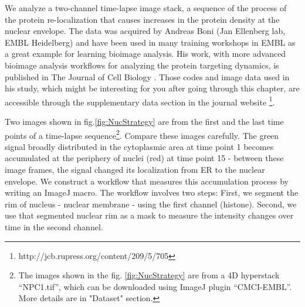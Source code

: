  We analyze a two-channel time-lapse image stack, a sequence of the process of the protein re-localization that causes increases in the protein density at the nuclear envelope. The data was acquired by Andreas Boni (Jan Ellenberg lab, EMBL Heidelberg) and have been used in many training workshops in EMBL as a great example for learning bioimage analysis. His work, with more advanced bioimage analysis workflows for analyzing the protein targeting dynamics, is published in The Journal of Cell Biology \citep{Boni2015}. Those codes and image data used in his study, which might be interesting for you after going through this chapter, are accessible through the supplementary data section in the journal website \footnote{http://jcb.rupress.org/content/209/5/705}. 
 
 Two images shown in fig.\ref{fig:NucStrategy} are from the first and the last time points of a time-lapse sequence\footnote{The images shown in the fig. \ref{fig:NucStrategy} are from a 4D hyperstack ``NPC1.tif'', which can be downloaded using ImageJ plugin ``CMCI-EMBL''. More details are in "Dataset" section.}. Compare these images carefully. The green signal broadly distributed in the cytoplasmic area at time point 1 becomes accumulated at the periphery of nuclei (red) at time point 15 - between these image frames, the signal changed its localization from ER to the nuclear envelope. We construct a workflow that measures this accumulation process by writing an ImageJ macro. The workflow involves two steps: First, we segment the rim of nucleus - nuclear membrane - using the first channel (histone). Second, we use that segmented nuclear rim as a mask to measure the intensity changes over time in the second channel. 

